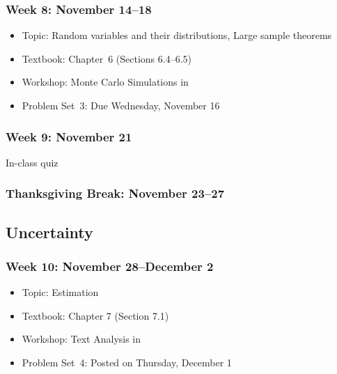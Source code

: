 \documentclass[11pt]{article}
\begin{document}
\subsubsection*{\sc Week 8: November 14--18}

\begin{itemize}

\item {\sc Topic}: Random variables and their distributions, Large
  sample theorems

\item {\sc Textbook}: Chapter~6 (Sections 6.4--6.5)

\item {\sc Workshop}: Monte Carlo Simulations in \R

\item {\sc Problem Set~3}: Due Wednesday, November 16 

\end{itemize}

\subsubsection*{\sc Week 9: November 21} 

{\sc In-class quiz}

\subsubsection*{\sc Thanksgiving Break: November 23--27}

\subsection*{Uncertainty}

\subsubsection*{\sc Week 10: November 28--December 2}

\begin{itemize}

\item {\sc Topic}: Estimation
\item {\sc Textbook}: Chapter 7 (Section 7.1)
\item {\sc Workshop}: Text Analysis in \R
\item {\sc Problem Set~4}: Posted on Thursday, December 1

\end{itemize}
\end{document}
